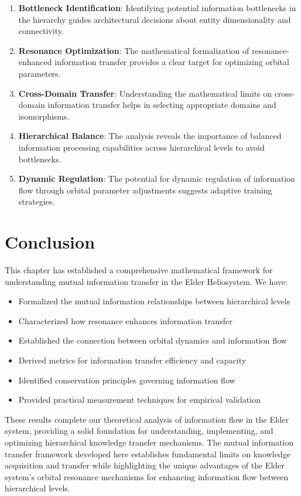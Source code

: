\begin{enumerate}
    \item \textbf{Bottleneck Identification}: Identifying potential information bottlenecks in the hierarchy guides architectural decisions about entity dimensionality and connectivity.
    
    \item \textbf{Resonance Optimization}: The mathematical formalization of resonance-enhanced information transfer provides a clear target for optimizing orbital parameters.
    
    \item \textbf{Cross-Domain Transfer}: Understanding the mathematical limits on cross-domain information transfer helps in selecting appropriate domains and isomorphisms.
    
    \item \textbf{Hierarchical Balance}: The analysis reveals the importance of balanced information processing capabilities across hierarchical levels to avoid bottlenecks.
    
    \item \textbf{Dynamic Regulation}: The potential for dynamic regulation of information flow through orbital parameter adjustments suggests adaptive training strategies.
\end{enumerate}

\section{Conclusion}

This chapter has established a comprehensive mathematical framework for understanding mutual information transfer in the Elder Heliosystem. We have:

\begin{itemize}
    \item Formalized the mutual information relationships between hierarchical levels
    \item Characterized how resonance enhances information transfer
    \item Established the connection between orbital dynamics and information flow
    \item Derived metrics for information transfer efficiency and capacity
    \item Identified conservation principles governing information flow
    \item Provided practical measurement techniques for empirical validation
\end{itemize}

These results complete our theoretical analysis of information flow in the Elder system, providing a solid foundation for understanding, implementing, and optimizing hierarchical knowledge transfer mechanisms. The mutual information transfer framework developed here establishes fundamental limits on knowledge acquisition and transfer while highlighting the unique advantages of the Elder system's orbital resonance mechanisms for enhancing information flow between hierarchical levels.